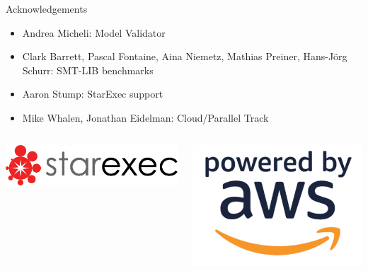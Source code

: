 \documentclass[table]{beamer}
\def\emph#1{\textcolor{MYblue}{#1}}
\begin{document}
\begin{frame}{Acknowledgements}
  \begin{itemize}
  \item \emph{Andrea Micheli}: Model Validator
  \item \emph{Clark Barrett, Pascal Fontaine, Aina Niemetz, Mathias Preiner, Hans-Jörg Schurr}: SMT-LIB benchmarks
  \item \emph{Aaron Stump}: StarExec support
  \item \emph{Mike Whalen, Jonathan Eidelman}: Cloud/Parallel Track
  \end{itemize}
  \bigskip

  \begin{columns}
    \begin{column}{.3\textwidth}
      \includegraphics[width=\textwidth]{starlogo}
    \end{column}
    \begin{column}{.17\textwidth}
      \includegraphics[width=\textwidth]{powered-by-aws}
    \end{column}
  \end{columns}
\end{frame}
\end{document}
